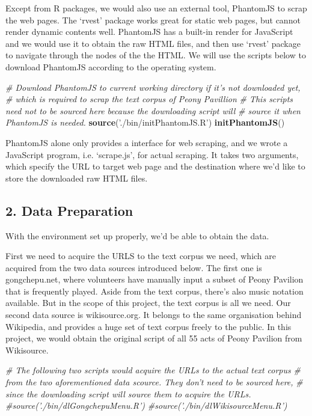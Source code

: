 \documentclass[]{article}
\newenvironment{Shaded}{\begin{snugshade}}{\end{snugshade}}
\newcommand{\CommentTok}[1]{\textcolor[rgb]{0.56,0.35,0.01}{\textit{#1}}}
\newcommand{\KeywordTok}[1]{\textcolor[rgb]{0.13,0.29,0.53}{\textbf{#1}}}
\newcommand{\NormalTok}[1]{#1}
\newcommand{\StringTok}[1]{\textcolor[rgb]{0.31,0.60,0.02}{#1}}
\begin{document}
Except from R packages, we would also use an external tool, PhantomJS to
scrap the web pages. The `rvest' package works great for static web
pages, but cannot render dynamic contents well. PhantomJS has a built-in
render for JavaScript and we would use it to obtain the raw HTML files,
and then use `rvest' package to navigate through the nodes of the the
HTML. We will use the scripts below to download PhantomJS according to
the operating system.

\begin{Shaded}
\begin{Highlighting}[]
\CommentTok{# Download PhantomJS to current working directory if it's not downloaded yet,}
\CommentTok{# which is required to scrap the text corpus  of Peony Pavillion}
\CommentTok{# This scripts need not to be sourced here because the downloading script will}
\CommentTok{# source it when PhantomJS is needed.}
\KeywordTok{source}\NormalTok{(}\StringTok{'./bin/initPhantomJS.R'}\NormalTok{)}
\KeywordTok{initPhantomJS}\NormalTok{()}
\end{Highlighting}
\end{Shaded}

PhantomJS alone only provides a interface for web scraping, and we wrote
a JavaScript program, i.e. `scrape.js', for actual scraping. It takes
two arguments, which specify the URL to target web page and the
destination where we'd like to store the downloaded raw HTML files.

\hypertarget{data-preparation}{%
\subsection{2. Data Preparation}\label{data-preparation}}

With the environment set up properly, we'd be able to obtain the data.

First we need to acquire the URLS to the text corpus we need, which are
acquired from the two data sources introduced below. The first one is
gongchepu.net, where volunteers have manually input a subset of Peony
Pavilion that is frequently played. Aside from the text corpus, there's
also music notation available. But in the scope of this project, the
text corpus is all we need. Our second data source is wikisource.org. It
belongs to the same organisation behind Wikipedia, and provides a huge
set of text corpus freely to the public. In this project, we would
obtain the original script of all 55 acts of Peony Pavilion from
Wikisource.

\begin{Shaded}
\begin{Highlighting}[]
\CommentTok{# The following two scripts would acquire the URLs to the actual text corpus}
\CommentTok{# from the two aforementioned data scource. They don't need to be sourced here,}
\CommentTok{# since the downloading script will source them to acquire the URLs.}
\CommentTok{#source('./bin/dlGongchepuMenu.R')}
\CommentTok{#source('./bin/dlWikisourceMenu.R')}
\end{Highlighting}
\end{Shaded}
\end{document}
